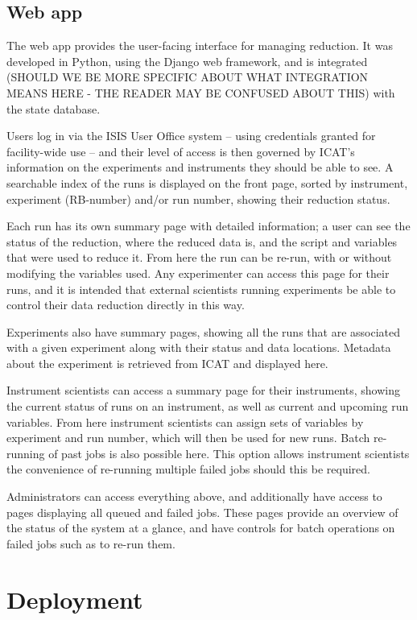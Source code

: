\documentclass[twocolumn]{article}
\begin{document}
\subsection{Web app}\label{web-app}

The web app provides the user-facing interface for managing reduction.
It was developed in Python, using the Django web framework, and is
integrated (SHOULD WE BE MORE SPECIFIC ABOUT WHAT INTEGRATION
MEANS HERE - THE READER MAY BE CONFUSED ABOUT THIS) with the state database.

Users log in via the ISIS User Office system -- using credentials 
granted for facility-wide use -- and their level of access is then 
governed by ICAT's information on the experiments and instruments they 
should be able to see. A searchable index of the runs is displayed on the front page, sorted
by instrument, experiment (RB-number) and/or run number, showing their reduction
status.

Each run has its own summary page with detailed information; a user can
see the status of the reduction, where the reduced data is, and the
script and variables that were used to reduce it. From here the run can
be re-run, with or without modifying the variables used. Any
experimenter can access this page for their runs, and it is intended that
external scientists running experiments be able to control their data
reduction directly in this way.

Experiments also have summary pages, showing all the runs that are
associated with a given experiment along with their status and data
locations. Metadata about the experiment is retrieved from ICAT and
displayed here.

Instrument scientists can access a summary page for their instruments,
showing the current status of runs on an instrument, as well as current
and upcoming run variables. From here instrument scientists can assign
sets of variables by experiment and run number, which will then be used
for new runs. Batch re-running of past jobs
is also possible here. This option allows instrument scientists
the convenience of re-running multiple failed jobs should this be required. 

Administrators can access everything above, and additionally have access
to pages displaying all queued and failed jobs. These pages provide an
overview of the status of the system at a glance, and have controls for
batch operations on failed jobs such as to re-run them.

\section{Deployment}\label{deployment}
\end{document}
